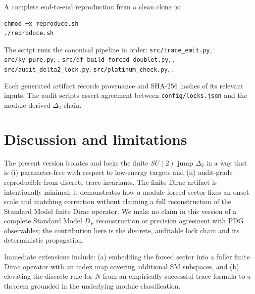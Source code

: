 \documentclass[11pt]{article}
\begin{document}
A complete end-to-end reproduction from a clean clone is:
\begin{verbatim}
chmod +x reproduce.sh
./reproduce.sh
\end{verbatim}
The script runs the canonical pipeline in order:
\texttt{src/trace\_emit.py},
\texttt{src/ky\_pure.py},
\texttt{},
\texttt{src/df\_build\_forced\_doublet.py},
\texttt{},
\texttt{src/audit\_delta2\_lock.py},
\texttt{src/platinum\_check.py},
\texttt{}.

Each generated artifact records provenance and SHA-256 hashes of its relevant inputs. The audit scripts assert agreement between \texttt{config/locks.json} and the module-derived $\Delta_2$ chain.

\section{Discussion and limitations}
The present version isolates and locks the finite $SU(2)$ jump $\Delta_2$ in a way that is (i) parameter-free with respect to low-energy targets and (ii) audit-grade reproducible from discrete trace invariants. The finite Dirac artifact is intentionally minimal: it demonstrates how a module-forced sector fixes an onset scale and matching correction without claiming a full reconstruction of the Standard Model finite Dirac operator. We make no claim in this version of a complete Standard Model $D_F$ reconstruction or precision agreement with PDG observables; the contribution here is the discrete, auditable lock chain and its deterministic propagation.

Immediate extensions include: (a) embedding the forced sector into a fuller finite Dirac operator with an index map covering additional SM subspaces, and (b) elevating the discrete rule for $N$ from an empirically successful trace formula to a theorem grounded in the underlying module classification.




\end{document}

